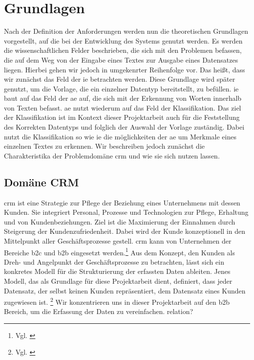 \chapter{Grundlagen} %
Nach der Definition der Anforderungen werden nun die theoretischen Grundlagen vorgestellt, auf die bei der Entwicklung des Systems genutzt werden. Es werden die wissenschaftlichen Felder beschrieben, die sich mit den Problemen befassen, die auf dem Weg von der Eingabe eines Textes zur Ausgabe eines Datensatzes liegen. Hierbei gehen wir jedoch in umgekenrter Reihenfolge vor. Das heißt, dass wir zunächst das Feld der \gls{ie} betrachten werden. Diese Grundlage wird später genutzt, um die Vorlage, die ein einzelner Datentyp bereitstellt, zu befüllen. \gls{ie} baut auf das Feld der \gls{ae} auf, die sich mit der Erkennung von Worten innerhalb von Texten befasst. \gls{ae} nutzt wiederum auf das Feld der Klassifikation. Das ziel der Klassifikation ist im Kontext dieser Projektarbeit auch für die Feststellung des Korrekten Datentyps und folglich der Auswahl der Vorlage zuständig. Dabei nutzt die Klassifikation so wie \gls{ie} die möglichkeiten der \gls{ae} um Merkmale eines einzelnen Textes zu erkennen. Wir beschreiben jedoch zunächst die Charakteristika der Problemdomäne \gls{crm} und wie sie sich nutzen lassen.


\section{Domäne CRM}
\gls{crm} ist eine Strategie zur Pflege der Beziehung eines Unternehmens mit dessen Kunden. Sie integriert Personal, Prozesse und Technologien zur Pflege, Erhaltung und von Kundenbeziehungen. Ziel ist die Maximierung der Einnahmen durch Steigerung der Kundenzufriedenheit. Dabei wird der Kunde konzeptionell in den Mittelpunkt aller Geschäftsprozesse gestell. \gls{crm} kann von Unternehmen der Bereiche \gls{b2c} und \gls{b2b} eingesetzt werden.\footnote{Vgl. \cite{chen2003understanding}} Aus dem Konzept, den Kunden als Dreh- und Angelpunkt der Geschäftsprozesse zu betrachten, lässt sich ein konkretes Modell für die Strukturierung der erfassten Daten ableiten. Jenes Modell, das als Grundlage für diese Projektarbeit dient, definiert, dass jeder Datensatz, der selbst keinen Kunden repräsentiert, dem Datensatz eines Kunden zugewiesen ist. \footnote{Vgl. \cite{puckey2001modeling}} Wir konzentrieren uns in dieser Projektarbeit auf den \gls{b2b} Bereich, um die Erfassung der Daten zu vereinfachen.
relation?

